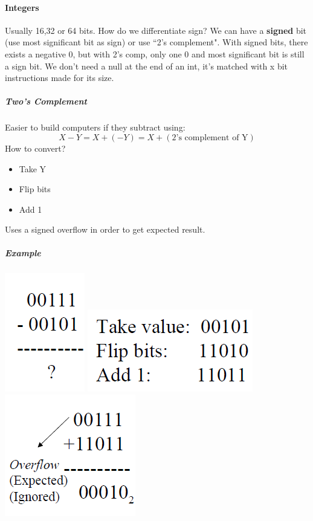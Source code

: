 \documentclass[12 pt]{article}
\begin{document}
	\paragraph{Integers} Usually 16,32 or 64 bits. How do we differentiate sign? We can have a \textbf{signed} bit (use most significant bit as sign) or use ``2's complement". With signed bits, there exists a negative 0, but with 2's comp, only one 0 and most significant bit is still a sign bit. We don't need a null at the end of an int, it's matched with x bit instructions made for its size. 
	\subparagraph{Two's Complement} Easier to build computers if they subtract using: 
	\begin{equation*}
		X-Y=X+(-Y)=X+(\text{2's complement of Y})
	\end{equation*}
	How to convert? \begin{itemize}
		\item Take Y
		\item Flip bits
		\item Add 1
		\end{itemize} 
		Uses a signed overflow in order to get expected result.
	\subparagraph{Example}
	\includegraphics[scale=0.5]{22} \includegraphics[scale=0.5]{22a} \includegraphics[scale=0.5]{22b}
\end{document}
